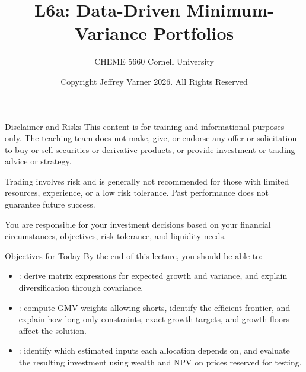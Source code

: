 \documentclass[aspectratio=169,11pt]{beamer}
\title{\texorpdfstring{{\vnheavy L6a}}{L6a}: Data-Driven Minimum-Variance Portfolios}
\subtitle{CHEME 5660 Cornell University}
\author{Copyright Jeffrey Varner 2026. All Rights Reserved}
\begin{document}
\vntitlepage

\begin{frame}{Disclaimer and Risks}
  \vspace{0.6em}
  \textbf{} This content is for training and informational
  purposes only. The teaching team does not make, give, or endorse any offer or
  solicitation to buy or sell securities or derivative products, or provide
  investment or trading advice or strategy.

  \vspace{1.1em}
  \textbf{} Trading involves risk and is generally not recommended for
  those with limited resources, experience, or a low risk tolerance. Past
  performance does not guarantee future success.

  \vspace{1.1em}
  \textbf{} You are responsible for your investment decisions
  based on your financial circumstances, objectives, risk tolerance, and
  liquidity needs.
\end{frame}

\begin{frame}{Objectives for Today}
  By the end of this lecture, you should be able to:

  \vspace{0.4em}
  \begin{itemize}\setlength{\itemsep}{0.6em}
    \item {}: derive matrix expressions
      for expected growth and variance, and explain diversification through covariance.
    \item {}: compute GMV weights
      allowing shorts, identify the efficient frontier, and explain how long-only
      constraints, exact growth targets, and growth floors affect the solution.
    \item {}: identify which estimated inputs
      each allocation depends on, and evaluate the resulting investment using
      wealth and NPV on prices reserved for testing.
  \end{itemize}
\end{frame}
\end{document}
